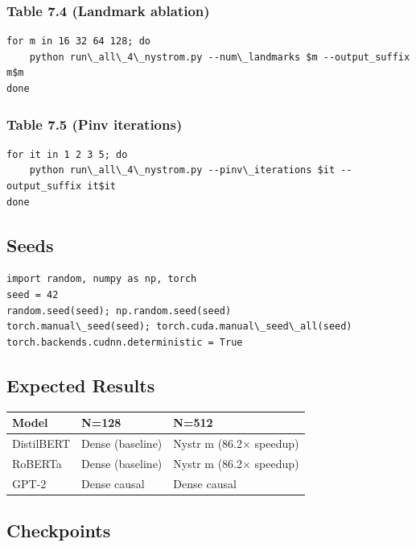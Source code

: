 \subsubsection{Table 7.4 (Landmark ablation)}

\begin{lstlisting}
for m in 16 32 64 128; do
    python run\_all\_4\_nystrom.py --num\_landmarks $m --output_suffix m$m
done
\end{lstlisting}

\subsubsection{Table 7.5 (Pinv iterations)}

\begin{lstlisting}
for it in 1 2 3 5; do
    python run\_all\_4\_nystrom.py --pinv\_iterations $it --output_suffix it$it
done
\end{lstlisting}

\subsection{Seeds}

\begin{lstlisting}
import random, numpy as np, torch
seed = 42
random.seed(seed); np.random.seed(seed)
torch.manual\_seed(seed); torch.cuda.manual\_seed\_all(seed)
torch.backends.cudnn.deterministic = True
\end{lstlisting}

\subsection{Expected Results}

\begin{table}[H]
\centering
\small
\begin{tabular}{lll}
\toprule
\textbf{Model} & \textbf{N=128} & \textbf{N=512} \\
\midrule
DistilBERT & Dense (baseline) & Nystr m (86.2$\times$ speedup) \\
RoBERTa & Dense (baseline) & Nystr m (86.2$\times$ speedup) \\
GPT-2 & Dense causal & Dense causal \\
\bottomrule
\end{tabular}
\end{table}

\subsection{Checkpoints}

